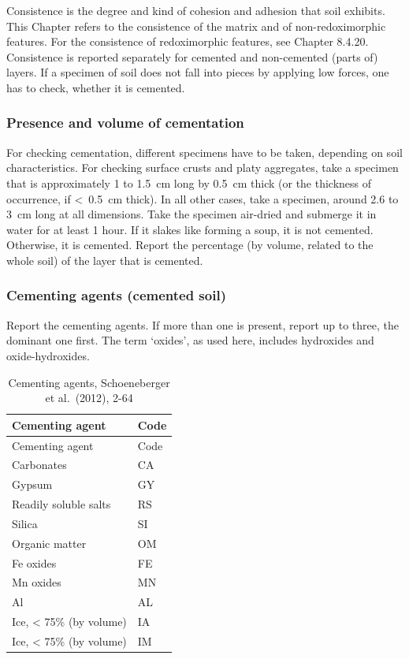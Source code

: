 \documentclass[
  letterpaper,
  DIV=11,
  numbers=noendperiod]{scrreprt}
\begin{document}
Consistence is the degree and kind of cohesion and adhesion that soil
exhibits. This Chapter refers to the consistence of the matrix and of
non-redoximorphic features. For the consistence of redoximorphic
features, see Chapter 8.4.20. Consistence is reported separately for
cemented and non-cemented (parts of) layers. If a specimen of soil does
not fall into pieces by applying low forces, one has to check, whether
it is cemented.

\hypertarget{presence-and-volume-of-cementation}{%
\subsubsection{Presence and volume of
cementation}\label{presence-and-volume-of-cementation}}

For checking cementation, different specimens have to be taken,
depending on soil characteristics. For checking surface crusts and platy
aggregates, take a specimen that is approximately 1 to 1.5~cm long by
0.5~cm thick (or the thickness of occurrence, if \textless~0.5~cm
thick). In all other cases, take a specimen, around 2.6 to 3~cm long at
all dimensions. Take the specimen air-dried and submerge it in water for
at least 1 hour. If it slakes like forming a soup, it is not cemented.
Otherwise, it is cemented. Report the percentage (by volume, related to
the whole soil) of the layer that is cemented.

\hypertarget{cementing-agents-cemented-soil}{%
\subsubsection{Cementing agents (cemented
soil)}\label{cementing-agents-cemented-soil}}

Report the cementing agents. If more than one is present, report up to
three, the dominant one first. The term `oxides', as used here, includes
hydroxides and oxide-hydroxides.

\begin{longtable}[]{@{}ll@{}}
\caption{Cementing agents, Schoeneberger et al.~(2012),
2-64}\tabularnewline
\toprule()
Cementing agent & Code \\
\midrule()
\endfirsthead
\toprule()
Cementing agent & Code \\
\midrule()
\endhead
Carbonates & CA \\
Gypsum & GY \\
Readily soluble salts & RS \\
Silica & SI \\
Organic matter & OM \\
Fe oxides & FE \\
Mn oxides & MN \\
Al & AL \\
Ice, \textless{} 75\% (by volume) & IA \\
Ice, \textless{} 75\% (by volume) & IM \\
\bottomrule()
\end{longtable}
\end{document}
